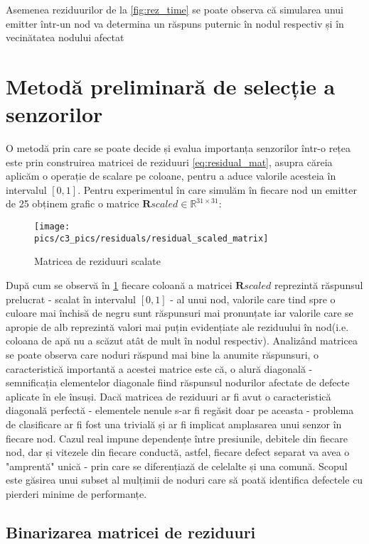 Asemenea reziduurilor de la \ref{fig:rez_time} se poate observa că simularea unui emitter într-un nod va determina un răspuns puternic în nodul respectiv și în vecinătatea nodului afectat

\section{Metodă preliminară de selecție a senzorilor}
O metodă prin care se poate decide și evalua importanța senzorilor într-o rețea este prin construirea matricei de reziduuri \eqref{eq:residual_mat}, asupra căreia aplicăm o operație de scalare pe coloane, pentru a aduce valorile acesteia în intervalul $[0,1]$. Pentru experimentul în care simulăm în fiecare nod un emitter de 25 obținem grafic o matrice $\mathbf{R}scaled \in \mathbb{R}^{31 \times 31}$:

\begin{figure}[H]
\centering
\texttt{[image: \\pics/c3\_pics/residuals/residual\_scaled\_matrix]}
\caption{Matricea de reziduuri scalate}
\label{fig:rez_scaled_matrix_img}
\end{figure} 

După cum se observă în \ref{fig:rez_scaled_matrix_img} fiecare coloană a matricei $\mathbf{R}scaled$ reprezintă răspunsul prelucrat - scalat în intervalul $[0,1]$ - al unui nod, valorile care tind spre o culoare mai închisă de negru sunt răspunsuri mai pronunțate iar valorile care se apropie de alb reprezintă valori mai puțin evidențiate ale reziduului în nod(i.e. coloana de apă nu a scăzut atât de mult în nodul respectiv). Analizând matricea se poate observa care noduri răspund mai bine la anumite răspunsuri, o caracteristică importantă a acestei matrice este că, o alură diagonală - semnificația elementelor diagonale fiind răspunsul nodurilor afectate de defecte aplicate în ele însuși. Dacă matricea de reziduuri ar fi avut o caracteristică diagonală perfectă - elementele nenule s-ar fi regăsit doar pe aceasta - problema de clasificare ar fi fost una trivială și ar fi implicat amplasarea unui senzor în fiecare nod. Cazul real impune dependențe între presiunile, debitele din fiecare nod, dar și vitezele din fiecare conductă, astfel, fiecare defect separat va avea o "amprentă" unică - prin care se diferențiază de celelalte și una comună. Scopul este găsirea unui subset al mulțimii de noduri care să poată identifica defectele cu pierderi minime de performanțe.


\subsection{Binarizarea matricei de reziduuri}

